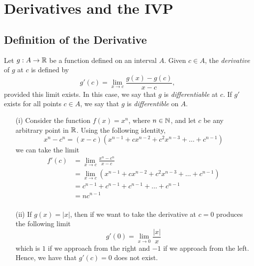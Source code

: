 \section{Derivatives and the IVP}

\subsection{Definition of the Derivative}

\begin{definition}[Differentiability]
    Let \( g : A \to \mathbb{R}  \) be a function defined on an interval \( A  \). Given \( c \in A  \), the \textit{derivative} of \( g  \) at \( c  \) is defined by 
    \[ g'(c) = \lim_{ x \to c } \frac{ g(x) - g(c)  }{ x - c  }, \]
    provided this limit exists. In this case, we say that \( g  \) is \textit{differentiable} at \( c  \). If \( g'  \) exists for all points \( c \in A  \), we say that \( g  \) is \textit{differentible} on \( A  \).
\end{definition}


        \begin{enumerate}
            \item[(i)] Consider the function \( f(x) = x^n  \), where \( n \in \mathbb{N}  \), and let \( c  \) be any arbitrary point in \( \mathbb{R}  \). Using the following identity, 
                \[  x^n - c^n = (x -c )(x^{n-1} + cx^{n-2} + c^2 x^{n-3} + \dots + c^{n-1}) \]
                we can take the limit 
                \begin{align*}
                    f'(c) &= \lim_{ x \to c  } \frac{ x^n - c^n  }{ x - c  }  \\
                          &= \lim_{ x \to c } (x^{n-1} + cx^{n-2} + c^2 x^{n-3} + \dots + c^{n-1}) \\
                          &= c^{n-1} + c^{n-1} + c^{n-1} + \dots + c^{n-1} \\
                          &= nc^{n-1}\\
                \end{align*}
            \item[(ii)] If \( g(x) = | x  |  \), then if we want to take the derivative at \( c =0  \) produces the following limit
                \[  g'(0) = \lim_{ x \to 0 } \frac{ | x |  }{ x }  \]
                which is \( 1 \) if we approach from the right and \( -1 \) if we approach from the left. Hence, we have that \(g'(c) =  0  \) does not exist.
        \end{enumerate}

